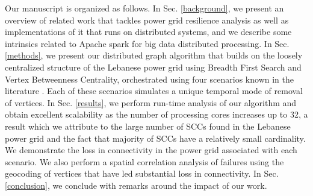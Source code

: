 Our manuscript is organized as follows. In Sec. \ref{background}, we present an overview of related work that tackles power grid resilience analysis as well as implementations of it that runs on distributed systems, and we describe some intrinsics related to Apache spark for big data distributed processing. In Sec. \ref{methods}, we present our distributed graph algorithm that builds on the loosely centralized structure of the Lebanese power grid using Breadth First Search and Vertex Betweenness Centrality, orchestrated using four scenarios known in the literature \cite{2000Natur.406..378A}.
 Each of these scenarios simulates a unique temporal mode of removal of vertices.
 In Sec. \ref{results}, we perform run-time analysis of our algorithm and obtain excellent scalability as the number of processing cores increases up to 32, a result which we attribute to the large number of SCCs found in the Lebanese power grid and the fact that majority of SCCs have a relatively small cardinality. We demonstrate the loss in connectivity in the power grid associated with each scenario. We also perform a spatial correlation analysis of failures using the geocoding of vertices that have led substantial loss in connectivity. In Sec. \ref{conclusion}, we conclude with remarks around the impact of our work.%





